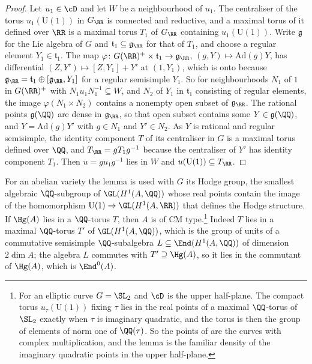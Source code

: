 \begin{proof}
Let $u_{1}\in\cD$ and let $W$ be a neighbourhood of $u_{1}$. The centraliser
of the torus $u_{1}(\mathrm{U}(1))$ in $G_{\RR}$ is connected and reductive,
and a maximal torus of it defined over $\RR$ is a maximal torus $T_{1}$ of
$G_{\RR}$ containing $u_{1}(\mathrm{U}(1))$. Write $\mathfrak{g}$ for the Lie
algebra of $G$ and $\mathfrak{t}_{1}\subseteq\mathfrak{g}_{\RR}$ for that of
$T_{1}$, and choose a regular element $Y_{1}\in\mathfrak{t}_{1}$. The map
$\varphi\colon G(\RR)^{+}\times\mathfrak{t}_{1}\to\mathfrak{g}_{\RR}$,
$(g,Y)\mapsto\mathrm{Ad}(g)Y$, has differential
$(Z,Y')\mapsto[Z,Y_{1}]+Y'$ at $(1,Y_{1})$, which is onto because
$\mathfrak{g}_{\RR}=\mathfrak{t}_{1}\oplus[\mathfrak{g}_{\RR},Y_{1}]$ for a
regular semisimple $Y_{1}$. So for neighbourhoods $N_{1}$ of $1$ in
$G(\RR)^{+}$ with $N_{1}u_{1}N_{1}^{-1}\subseteq W$, and $N_{2}$ of $Y_{1}$
in $\mathfrak{t}_{1}$ consisting of regular elements, the image
$\varphi(N_{1}\times N_{2})$ contains a nonempty open subset of
$\mathfrak{g}_{\RR}$. The rational points $\mathfrak{g}(\QQ)$ are dense in
$\mathfrak{g}_{\RR}$, so that open subset contains some
$Y\in\mathfrak{g}(\QQ)$, and $Y=\mathrm{Ad}(g)Y'$ with $g\in N_{1}$ and
$Y'\in N_{2}$. As $Y$ is rational and regular semisimple, the identity
component $T$ of its centraliser in $G$ is a maximal torus defined over
$\QQ$, and $T_{\RR}=gT_{1}g^{-1}$ because the centraliser of $Y'$ has
identity component $T_{1}$. Then $u=gu_{1}g^{-1}$ lies in $W$ and
$u(\mathrm{U}(1))\subseteq T_{\RR}$.
\end{proof}

For an abelian variety the lemma is used with $G$ its Hodge group, the
smallest algebraic $\QQ$-subgroup of $\GL(H^{1}(A,\QQ))$ whose real points
contain the image of the homomorphism $\mathrm{U}(1)\to\GL(H^{1}(A,\RR))$
that defines the Hodge structure. If $\Hg(A)$ lies in a $\QQ$-torus $T$, then
$A$ is of CM type.\footnote{For an elliptic curve $G=\SL_{2}$ and $\cD$ is
the upper half-plane. The compact torus $u_{\tau}(\mathrm{U}(1))$ fixing
$\tau$ lies in the real points of a maximal $\QQ$-torus of $\SL_{2}$ exactly
when $\tau$ is imaginary quadratic, and the torus is then the group of
elements of norm one of $\QQ(\tau)$. So the points of 
are the curves with complex multiplication, and the lemma is the familiar
density of the imaginary quadratic points in the upper half-plane.} Indeed $T$ lies in a maximal $\QQ$-torus $T'$ of
$\GL(H^{1}(A,\QQ))$, which is the group of units of a commutative semisimple
$\QQ$-subalgebra $L\subseteq\End(H^{1}(A,\QQ))$ of dimension $2\dim A$; the
algebra $L$ commutes with $T'\supseteq\Hg(A)$, so it lies in the commutant of
$\Hg(A)$, which is $\End^{0}(A)$.

